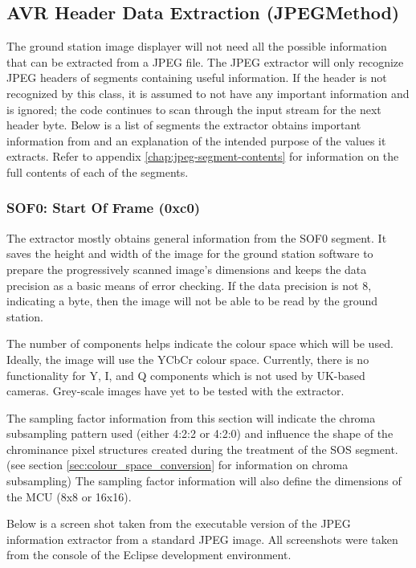 \subsection{AVR Header Data Extraction (JPEGMethod)}

The ground station image displayer will not need all the possible information that can be extracted from a JPEG file. 
The JPEG extractor will only recognize JPEG headers of segments containing useful information.
If the header is not recognized by this class, 
it is assumed to not have any important information and is ignored; 
the code continues to scan through the input stream for the next header byte. 
Below is a list of segments the extractor obtains important information from 
and an explanation of the intended purpose of the values it extracts. 
Refer to appendix \ref{chap:jpeg-segment-contents} for information on the full contents of each
of the segments.

\subsubsection{SOF0: Start Of Frame (0xc0)}

The extractor mostly obtains general information from the SOF0 segment. 
It saves the height and width of the image for the ground station
software to prepare the progressively scanned image's dimensions
and keeps the data precision as a basic means of error checking. 
If the data precision is not 8, indicating a byte, then the image will not
be able to be read by the ground station.

The number of components helps indicate the colour space which will
be used. Ideally, the image will use the YCbCr colour space. Currently,
there is no functionality for Y, I, and Q components  which is not
used by UK-based cameras. Grey-scale images have yet to be
tested with the extractor.

The sampling factor information from this section will indicate
the chroma subsampling pattern used (either 4:2:2 or 4:2:0)
and influence the shape of the chrominance pixel structures
created during the treatment of the SOS segment. 
(see section \ref{sec:colour_space_conversion}
for information on chroma subsampling) The 
sampling factor information will also define the dimensions of the
MCU (8x8 or 16x16).

Below is a screen shot taken from the executable version of
the JPEG information extractor from a standard JPEG image.
All screenshots were taken from the console of the Eclipse
development environment.

